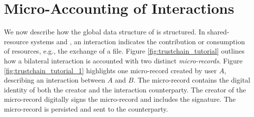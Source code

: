 \section{Micro-Accounting of Interactions}
\label{sec:micro_accounting}
We now describe how the global data structure of \ModelName{} is structured.
In shared-resource systems and \ModelName{}, an interaction indicates the contribution or consumption of resources, e.g., the exchange of a file.
Figure \ref{fig:trustchain_tutorial} outlines how a bilateral interaction is accounted with two distinct \emph{micro-records}.
Figure \ref{fig:trustchain_tutorial_1} highlights one micro-record created by user $ A $, describing an interaction between $ A $ and $ B $.
The micro-record contains the digital identity of both the creator and the interaction counterparty.
The creator of the micro-record digitally signs the micro-record and includes the signature.
The micro-record is persisted and sent to the counterparty.


